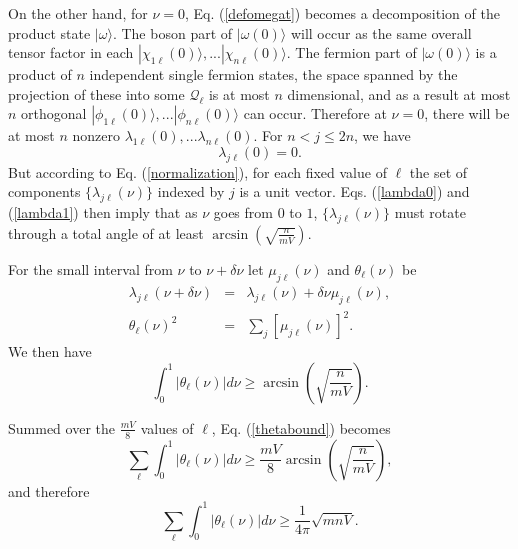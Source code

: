 \documentclass[12pt,amsmath,amssymb,onecolumn]{revtex4-2}
\begin{document}
On the other hand, for $\nu = 0$, Eq. (\ref{defomegat}) becomes a decomposition of 
the product state $|\omega \rangle $. The boson part of
$|\omega(0) \rangle $ will occur as the same overall tensor
factor in each $|\chi_{1\ell}(0) \rangle ,... |\chi_{n\ell}(0) \rangle $.
The fermion part of $|\omega(0) \rangle $
is a product of 
$n$ independent single fermion states,
the space spanned by the projection of these 
into some $\mathcal{Q}_\ell$ is at most $n$ dimensional,
and as a result at most
$n$ orthogonal $|\phi_{1\ell}(0) \rangle ,... |\phi_{n\ell}(0) \rangle $ can occur.
Therefore
at $\nu = 0$, there will be at most $n$ nonzero 
$\lambda_{1\ell}(0), ... \lambda_{n\ell}(0)$. For
$n < j \le 2n$, we have
\begin{equation}
\label{lambda0}
\lambda_{j\ell}( 0) = 0.
\end{equation}
But according to Eq. (\ref{normalization}),
for each fixed value
of $\ell$
the set of components $\{\lambda_{j\ell}( \nu)\}$
indexed by $j$ is a unit vector.
Eqs. (\ref{lambda0}) and (\ref{lambda1}) then imply that
as $\nu$ goes from $0$ to $1$,
$\{\lambda_{j\ell}( \nu)\}$ 
must rotate through a total angle of at least $\arcsin(\sqrt{\frac{n}{mV}})$.



For the small interval from $\nu$ to $\nu + \delta \nu$ let
$\mu_{j\ell}(\nu)$ and $\theta_{\ell}(\nu)$ be 
\begin{subequations}
\begin{eqnarray}
\label{mudeltat}
\lambda_{j\ell}(\nu + \delta \nu) & = & \lambda_{j\ell}( \nu ) + \delta \nu \mu_{j\ell}(\nu), \\
\label{thetaoft}
\theta_{\ell}( \nu)^2 & = & \sum_j [ \mu_{j\ell}(\nu)]^2. 
\end{eqnarray}
\end{subequations}
We then have
\begin{equation}
\label{thetabound}
\int_0^1 | \theta_{\ell}(\nu)| d \nu \ge \arcsin\left(\sqrt{\frac{n}{mV}} \right).
\end{equation}

Summed over the $\frac{mV}{8}$ values of $\ell$,
Eq. (\ref{thetabound}) becomes
\begin{equation}
\label{thetaboundsum}
\sum_{\ell} \int_0^1 | \theta_{\ell}(\nu)| d \nu  \ge 
\frac{ m V}{8} \arcsin\left(\sqrt{\frac{n}{mV}} \right),
\end{equation}
and therefore
\begin{equation}
\label{thetaboundsum1}
\sum_{\ell} \int_0^1 | \theta_{\ell}(\nu)| d \nu
\ge \frac{1}{4\pi} \sqrt{mnV}.
\end{equation}
\end{document}
